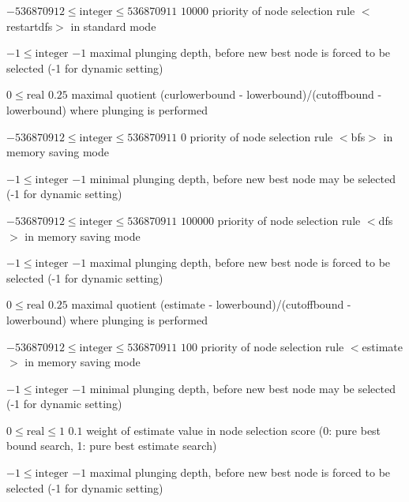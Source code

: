%
{$-536870912\leq\textrm{integer}\leq536870911$}%
{$10000$}%
{priority of node selection rule $<$restartdfs$>$ in standard mode}%
{}

%
{$-1\leq\textrm{integer}$}%
{$-1$}%
{maximal plunging depth, before new best node is forced to be selected (-1 for dynamic setting)}%
{}

%
{$0\leq\textrm{real}$}%
{$0.25$}%
{maximal quotient (curlowerbound - lowerbound)/(cutoffbound - lowerbound) where plunging is performed}%
{}

%
{$-536870912\leq\textrm{integer}\leq536870911$}%
{$0$}%
{priority of node selection rule $<$bfs$>$ in memory saving mode}%
{}

%
{$-1\leq\textrm{integer}$}%
{$-1$}%
{minimal plunging depth, before new best node may be selected (-1 for dynamic setting)}%
{}

%
{$-536870912\leq\textrm{integer}\leq536870911$}%
{$100000$}%
{priority of node selection rule $<$dfs$>$ in memory saving mode}%
{}

%
{$-1\leq\textrm{integer}$}%
{$-1$}%
{maximal plunging depth, before new best node is forced to be selected (-1 for dynamic setting)}%
{}

%
{$0\leq\textrm{real}$}%
{$0.25$}%
{maximal quotient (estimate - lowerbound)/(cutoffbound - lowerbound) where plunging is performed}%
{}

%
{$-536870912\leq\textrm{integer}\leq536870911$}%
{$100$}%
{priority of node selection rule $<$estimate$>$ in memory saving mode}%
{}

%
{$-1\leq\textrm{integer}$}%
{$-1$}%
{minimal plunging depth, before new best node may be selected (-1 for dynamic setting)}%
{}

%
{$0\leq\textrm{real}\leq1$}%
{$0.1$}%
{weight of estimate value in node selection score (0: pure best bound search, 1: pure best estimate search)}%
{}

%
{$-1\leq\textrm{integer}$}%
{$-1$}%
{maximal plunging depth, before new best node is forced to be selected (-1 for dynamic setting)}%
{}

